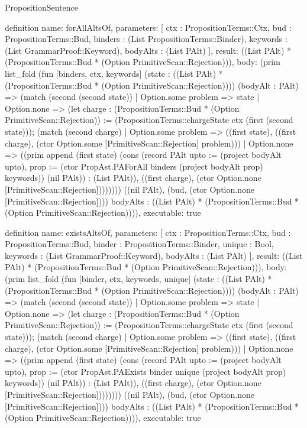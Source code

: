 \begin{lexlean}{PropositionSentence}
\begin{semanticmodule}
definition{
  name: forAllAltsOf,
  parameters: [
    ctx : PropositionTerms::Ctx,
    bud : PropositionTerms::Bud,
    binders : (List PropositionTerms::Binder),
    keywords : (List GrammarProof::Keyword),
    bodyAlts : (List PAlt)
  ],
  result: ((List PAlt) * (PropositionTerms::Bud * (Option PrimitiveScan::Rejection))),
  body: (prim list_fold (fun [binders, ctx, keywords] (state : ((List PAlt) * (PropositionTerms::Bud * (Option PrimitiveScan::Rejection)))) (bodyAlt : PAlt) => (match (second (second state))
    | Option.some problem => state
    | Option.none => (let charge : (PropositionTerms::Bud * (Option PrimitiveScan::Rejection)) := (PropositionTerms::chargeState ctx (first (second state))); (match (second charge)
        | Option.some problem => ((first state), ((first charge), (ctor Option.some [PrimitiveScan::Rejection] problem)))
        | Option.none => ((prim append (first state) (cons (record PAlt {upto := (project bodyAlt upto), prop := (ctor PropAst.PAForAll binders (project bodyAlt prop) keywords)}) (nil PAlt)) : (List PAlt)), ((first charge), (ctor Option.none [PrimitiveScan::Rejection]))))))) ((nil PAlt), (bud, (ctor Option.none [PrimitiveScan::Rejection]))) bodyAlts : ((List PAlt) * (PropositionTerms::Bud * (Option PrimitiveScan::Rejection)))),
  executable: true
}

definition{
  name: existsAltsOf,
  parameters: [
    ctx : PropositionTerms::Ctx,
    bud : PropositionTerms::Bud,
    binder : PropositionTerms::Binder,
    unique : Bool,
    keywords : (List GrammarProof::Keyword),
    bodyAlts : (List PAlt)
  ],
  result: ((List PAlt) * (PropositionTerms::Bud * (Option PrimitiveScan::Rejection))),
  body: (prim list_fold (fun [binder, ctx, keywords, unique] (state : ((List PAlt) * (PropositionTerms::Bud * (Option PrimitiveScan::Rejection)))) (bodyAlt : PAlt) => (match (second (second state))
    | Option.some problem => state
    | Option.none => (let charge : (PropositionTerms::Bud * (Option PrimitiveScan::Rejection)) := (PropositionTerms::chargeState ctx (first (second state))); (match (second charge)
        | Option.some problem => ((first state), ((first charge), (ctor Option.some [PrimitiveScan::Rejection] problem)))
        | Option.none => ((prim append (first state) (cons (record PAlt {upto := (project bodyAlt upto), prop := (ctor PropAst.PAExists binder unique (project bodyAlt prop) keywords)}) (nil PAlt)) : (List PAlt)), ((first charge), (ctor Option.none [PrimitiveScan::Rejection]))))))) ((nil PAlt), (bud, (ctor Option.none [PrimitiveScan::Rejection]))) bodyAlts : ((List PAlt) * (PropositionTerms::Bud * (Option PrimitiveScan::Rejection)))),
  executable: true
}


\end{semanticmodule}
\end{lexlean}
